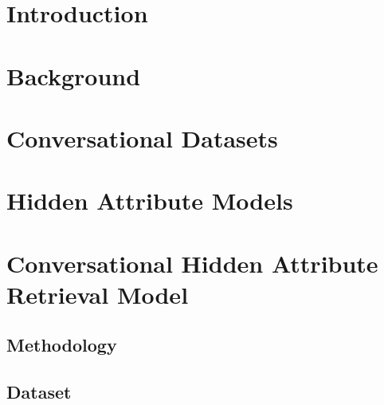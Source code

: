 \documentclass[a4paper, 12pt, twoside]{ThesisStyle}
\begin{document}



\dominitoc





\tableofcontents

\cleardoublepage

\mainmatter

\chapter{Introduction}
\minitoc


\chapter{Background}
\label{chap_backgr}
\minitoc




\chapter{Conversational Datasets}
\label{chap_datasets}
\minitoc





\chapter{Hidden Attribute Models}
\label{chap_ham}
\minitoc









\chapter{Conversational Hidden Attribute Retrieval Model}
\label{chap_charm}
\minitoc




\section{Methodology}

\section{Dataset}

\end{document}
